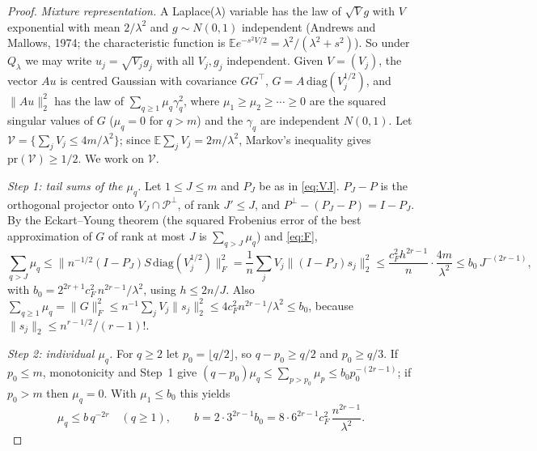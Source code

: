 \documentclass[11pt]{article}
\theoremstyle{definition}
\theoremstyle{remark}
\newcommand{\E}{\mathbb{E}}
\newcommand{\pr}{\mathrm{pr}}
\newcommand{\Ql}{Q_\lambda}
\newcommand{\Pp}{P^{\perp}}
\newcommand{\cP}{\mathcal P}
\begin{document}
\begin{proof}
\emph{Mixture representation.} A Laplace($\lambda$) variable has the law of $\sqrt V g$ with $V$ exponential with mean $2/\lambda^2$ and $g\sim N(0,1)$ independent (Andrews and Mallows, 1974; the characteristic function is $\E e^{-s^2V/2}=\lambda^2/(\lambda^2+s^2)$). So under $\Ql$ we may write $u_j=\sqrt{V_j}g_j$ with all $V_j,g_j$ independent. Given $V=(V_j)$, the vector $Au$ is centred Gaussian with covariance $GG^\top$, $G=A\,\mathrm{diag}(V_j^{1/2})$, and $\|Au\|_2^2$ has the law of $\sum_{q\ge1}\mu_q\gamma_q^2$, where $\mu_1\ge\mu_2\ge\cdots\ge0$ are the squared singular values of $G$ ($\mu_q=0$ for $q>m$) and the $\gamma_q$ are independent $N(0,1)$. Let $\mathcal V=\{\sum_jV_j\le4m/\lambda^2\}$; since $\E\sum_jV_j=2m/\lambda^2$, Markov's inequality gives $\pr(\mathcal V)\ge1/2$. We work on $\mathcal V$.

\emph{Step 1: tail sums of the $\mu_q$.} Let $1\le J\le m$ and $P_J$ be as in \eqref{eq:VJ}. $P_J-P$ is the orthogonal projector onto $V_J\cap\cP^\perp$, of rank $J'\le J$, and $\Pp-(P_J-P)=I-P_J$. By the Eckart--Young theorem (the squared Frobenius error of the best approximation of $G$ of rank at most $J$ is $\sum_{q>J}\mu_q$) and \eqref{eq:F},
\[
\sum_{q>J}\mu_q\le\bigl\|n^{-1/2}(I-P_J)S\,\mathrm{diag}(V_j^{1/2})\bigr\|_F^2=\frac1n\sum_jV_j\|(I-P_J)s_j\|_2^2\le\frac{c_F^2h^{2r-1}}{n}\cdot\frac{4m}{\lambda^2}\le b_0\,J^{-(2r-1)},
\]
with $b_0=2^{2r+1}c_F^2\,n^{2r-1}/\lambda^2$, using $h\le2n/J$. Also $\sum_{q\ge1}\mu_q=\|G\|_F^2\le n^{-1}\sum_jV_j\|s_j\|_2^2\le4c_F^2n^{2r-1}/\lambda^2\le b_0$, because $\|s_j\|_2\le n^{r-1/2}/(r-1)!$.

\emph{Step 2: individual $\mu_q$.} For $q\ge2$ let $p_0=\lfloor q/2\rfloor$, so $q-p_0\ge q/2$ and $p_0\ge q/3$. If $p_0\le m$, monotonicity and Step~1 give $(q-p_0)\mu_q\le\sum_{p>p_0}\mu_p\le b_0p_0^{-(2r-1)}$; if $p_0>m$ then $\mu_q=0$. With $\mu_1\le b_0$ this yields
\begin{equation}\label{eq:muq}
\mu_q\le b\,q^{-2r}\quad(q\ge1),\qquad b=2\cdot3^{2r-1}b_0=8\cdot6^{2r-1}c_F^2\,\frac{n^{2r-1}}{\lambda^2}.
\end{equation}


\end{proof}
\end{document}
